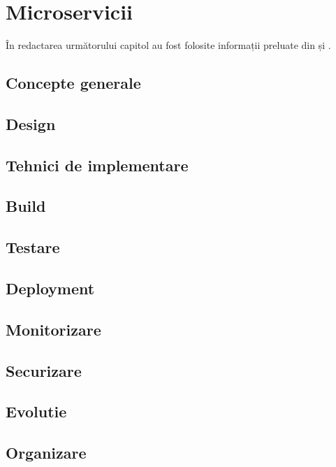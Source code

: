\chapter{Microservicii}
În redactarea următorului capitol au fost folosite informații preluate din
\cite{newman_2021} și \cite{hamilton_2022}.
\section{Concepte generale}

\section{Design}  

\section{Tehnici de implementare}

\section{Build}

\section{Testare} 

\section{Deployment}

\section{Monitorizare}

\section{Securizare}

\section{Evolutie}

\section{Organizare}

